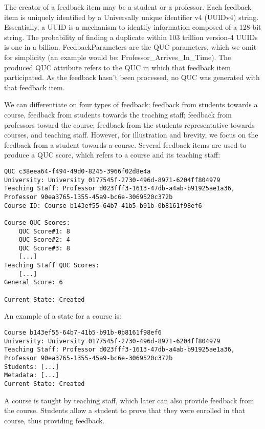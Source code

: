 \documentclass[12pt,a4paper]{article}
\theoremstyle{definition}
\begin{document}
    The creator of a feedback item may be a student or a professor. Each feedback item is uniquely identified by a Universally unique identifier  v4 (UUIDv4) string. Essentially, a UUID is a mechanism to identify information composed of a 128-bit string. The probability of finding a duplicate within 103 trillion version-4 UUIDs is one in a billion. FeedbackParameters are the QUC parameters, which we omit for simplicity (an example would be: Professor\_Arrives\_In\_Time).  The produced QUC attribute refers to the QUC in which that feedback item participated. As the feedback hasn't been processed, no QUC was generated with that feedback item.

    We can differentiate on four types of feedback: feedback from students towards a course, feedback from students towards the teaching staff; feedback from professors toward the course; feedback from the students representative towards courses, and teaching staff. However, for illustration and brevity, we focus on the feedback from a student towards a course. Several feedback items are used to produce a QUC score, which refers to a course and its teaching staff:


    \begin{verbatim}
QUC c38eea64-f494-49d0-8245-3966f02d8e4a
University: University 0177545f-2730-496d-8971-6204ff804979
Teaching Staff: Professor d023fff3-1613-47db-a4ab-b91925ae1a36, Professor 90ea3765-1355-45a9-bc6e-3069520c372b
Course ID: Course b143ef55-64b7-41b5-b91b-0b8161f98ef6

Course QUC Scores:
    QUC Score#1: 8
    QUC Score#2: 4
    QUC Score#3: 8
    [...]
Teaching Staff QUC Scores:
    [...]
General Score: 6

Current State: Created
    \end{verbatim}


    An example of a state for a course is:

    \begin{verbatim}
Course b143ef55-64b7-41b5-b91b-0b8161f98ef6
University: University 0177545f-2730-496d-8971-6204ff804979
Teaching Staff: Professor d023fff3-1613-47db-a4ab-b91925ae1a36, Professor 90ea3765-1355-45a9-bc6e-3069520c372b
Students: [...]
Metadata: [...]
Current State: Created
    \end{verbatim}

    A course is taught by teaching staff, which later can also provide feedback from the course. Students allow a student to prove that they were enrolled in that course, thus providing feedback.
\end{document}
